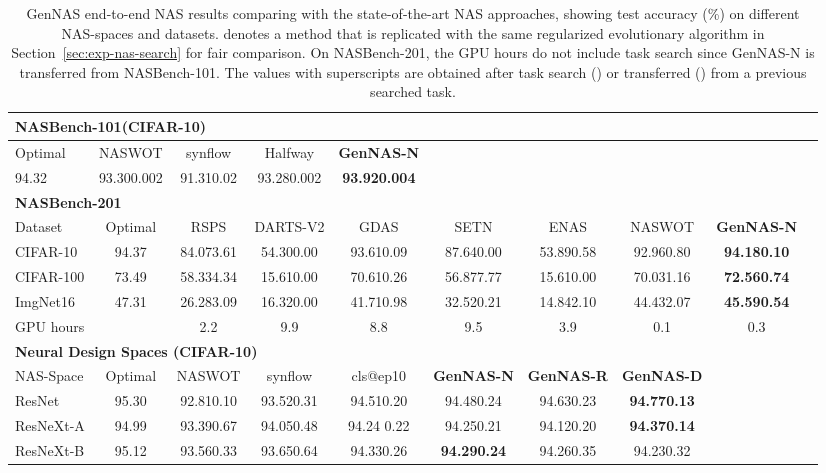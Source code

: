 \documentclass{article}
\begin{document}
\begin{table}[]
\vspace{-5pt}
\scriptsize
  \caption{GenNAS end-to-end NAS results comparing with the state-of-the-art NAS approaches, showing test accuracy (\%) on different NAS-spaces and datasets.  denotes a method that is replicated with the same regularized evolutionary algorithm in Section~\ref{sec:exp-nas-search} for fair comparison. On NASBench-201, the GPU hours do not include task search since GenNAS-N is transferred from NASBench-101. The values with superscripts are obtained after task search  () or transferred () from a previous searched task.
  }
  \label{table:GenNAS_NAS_end_to_end}
  \centering
  \scriptsize
\setlength{\tabcolsep}{3pt}
\begin{tabular}{lccccccccc}

\toprule
\multicolumn{6}{l}{\textbf{NASBench-101(CIFAR-10)}} \\ \midrule
Optimal & NASWOT & synflow & Halfway & \textbf{GenNAS-N} \\\midrule
94.32 & 93.300.002 & 91.310.02 & 93.280.002 & \textbf{93.920.004} \\

\toprule
\multicolumn{6}{l}{\textbf{NASBench-201}} \\ \midrule
Dataset & Optimal & RSPS & DARTS-V2 & GDAS & SETN & ENAS & NASWOT & \textbf{GenNAS-N} \\\midrule
CIFAR-10 & 94.37 & 84.073.61  & 54.300.00 & 93.610.09 & 87.640.00 & 53.890.58 & 92.960.80 & \textbf{94.180.10} \\

CIFAR-100 & 73.49 & 58.334.34 & 15.610.00  & 70.610.26 & 56.877.77 & 15.610.00 & 70.031.16 & \textbf{72.560.74} \\

ImgNet16 & 47.31 & 26.283.09  & 16.320.00 & 41.710.98 & 32.520.21 & 14.842.10 & 44.432.07 & \textbf{45.590.54} \\
\midrule
\multicolumn{2}{l}{GPU hours} & 2.2  & 9.9 & 8.8 & 9.5 & 3.9 & 0.1 & 0.3 \\

\toprule
\multicolumn{6}{l}{\textbf{Neural Design Spaces (CIFAR-10)}} \\ \midrule
NAS-Space & Optimal & NASWOT & synflow & cls@ep10 & \textbf{GenNAS-N} & \textbf{GenNAS-R} & \textbf{GenNAS-D} \\\midrule
ResNet & 95.30 & 92.810.10 & 93.520.31  & 94.510.20 & 94.480.24& 94.630.23 &\textbf{94.770.13} \\
ResNeXt-A &94.99 & 93.390.67 & 94.050.48 & 94.24 0.22& 94.250.21 &94.120.20 &\textbf{94.370.14}\\
ResNeXt-B & 95.12 & 93.560.33 & 93.650.64 & 94.330.26 &\textbf{94.290.24}& 94.260.35 &94.230.32\\

\bottomrule
\end{tabular}
\vspace{-8pt}
\end{table}
\end{document}

